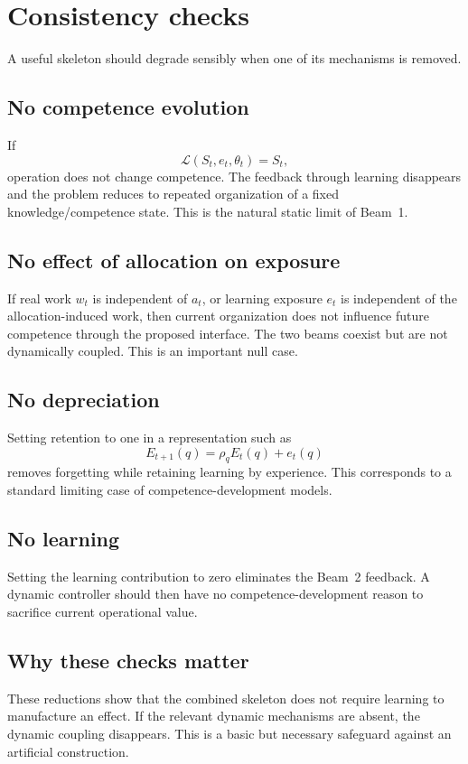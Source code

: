 \section{Consistency checks}

A useful skeleton should degrade sensibly when one of its mechanisms is removed.

\subsection{No competence evolution}

If
\[
\mathcal L(S_t,e_t,\theta_t)=S_t,
\]
operation does not change competence. The feedback through learning disappears and the
problem reduces to repeated organization of a fixed knowledge/competence state. This is the
natural static limit of Beam~1.

\subsection{No effect of allocation on exposure}

If real work \(w_t\) is independent of \(a_t\), or learning exposure \(e_t\) is independent
of the allocation-induced work, then current organization does not influence future competence
through the proposed interface. The two beams coexist but are not dynamically coupled. This
is an important null case.

\subsection{No depreciation}

Setting retention to one in a representation such as
\[
E_{t+1}(q)=\rho_q E_t(q)+e_t(q)
\]
removes forgetting while retaining learning by experience. This corresponds to a standard
limiting case of competence-development models.

\subsection{No learning}

Setting the learning contribution to zero eliminates the Beam~2 feedback. A dynamic controller
should then have no competence-development reason to sacrifice current operational value.

\subsection{Why these checks matter}

These reductions show that the combined skeleton does not require learning to manufacture an
effect. If the relevant dynamic mechanisms are absent, the dynamic coupling disappears. This
is a basic but necessary safeguard against an artificial construction.
